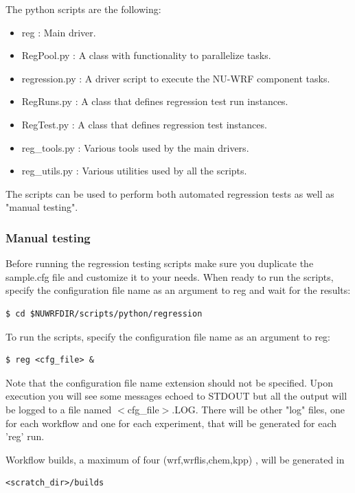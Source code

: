 The python scripts are the following:
\begin{itemize}
\item reg : Main driver.
\item RegPool.py    : A class with functionality to parallelize tasks.
\item regression.py : A driver script to execute the NU-WRF component tasks.
\item RegRuns.py    : A class that defines regression test run instances.
\item RegTest.py    : A class that defines regression test instances.
\item reg\_tools.py  : Various tools used by the main drivers.
\item reg\_utils.py  : Various utilities used by all the scripts.
\end{itemize}
The scripts can be used to perform both automated regression tests as well as "manual testing".

\subsubsection{Manual testing}

Before running the regression testing scripts make sure you duplicate the sample.cfg file
and customize it to your needs. When ready to run the scripts, specify the configuration file
name as an argument to reg and wait for the results:

\begin{verbatim}
$ cd $NUWRFDIR/scripts/python/regression
\end{verbatim}

To run the scripts, specify the configuration file name as an
argument to reg:

\begin{verbatim}
$ reg <cfg_file> &
\end{verbatim}

Note that the configuration file name extension should
not be specified. Upon execution you will see some messages echoed to STDOUT
but all the output will be logged to a file named $<$cfg\_file$>$.LOG.
There will be other "log" files, one for each  workflow and one for
each experiment, that will be generated for each 'reg' run.

Workflow builds, a maximum of four (wrf,wrflis,chem,kpp) , will be generated in

\begin{verbatim}
<scratch_dir>/builds
\end{verbatim}

